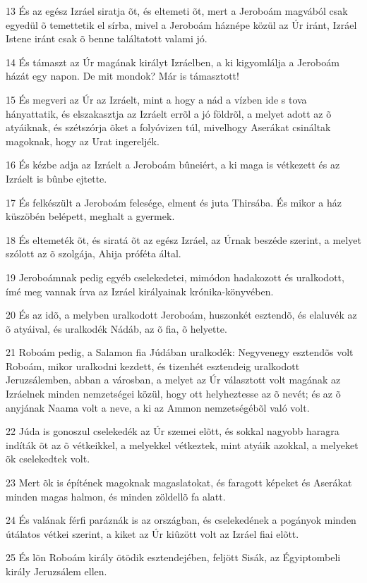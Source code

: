 \par 13 És az egész Izráel siratja õt, és eltemeti õt, mert a Jeroboám magvából csak egyedül õ temettetik el sírba, mivel a Jeroboám háznépe közül az Úr iránt, Izráel Istene iránt csak õ benne találtatott valami jó.
\par 14 És támaszt az Úr magának királyt Izráelben, a ki kigyomlálja a Jeroboám házát egy napon. De mit mondok? Már is támasztott!
\par 15 És megveri az Úr az Izráelt, mint a hogy a nád a vízben ide s tova hányattatik, és elszakasztja az Izráelt errõl a jó földrõl, a melyet adott az õ atyáiknak, és szétszórja õket a folyóvizen túl, mivelhogy Aserákat csináltak magoknak, hogy az Urat ingereljék.
\par 16 És kézbe adja az Izráelt a Jeroboám bûneiért, a ki maga is vétkezett és az Izráelt is bûnbe ejtette.
\par 17 És felkészült a Jeroboám felesége, elment és juta Thirsába. És mikor a ház küszöbén belépett, meghalt a gyermek.
\par 18 És eltemeték õt, és siratá õt az egész Izráel, az Úrnak beszéde szerint, a melyet szólott az õ szolgája, Ahija próféta által.
\par 19 Jeroboámnak pedig egyéb cselekedetei, mimódon hadakozott és uralkodott, ímé meg vannak írva az Izráel királyainak krónika-könyvében.
\par 20 És az idõ, a melyben uralkodott Jeroboám, huszonkét esztendõ, és elaluvék az õ atyáival, és uralkodék Nádáb, az õ fia, õ helyette.
\par 21 Roboám pedig, a Salamon fia Júdában uralkodék: Negyvenegy esztendõs volt Roboám, mikor uralkodni kezdett, és tizenhét esztendeig uralkodott Jeruzsálemben, abban a városban, a melyet az Úr választott volt magának az Izráelnek minden nemzetségei közül, hogy ott helyheztesse az õ nevét; és az õ anyjának Naama volt a neve, a ki az  Ammon nemzetségébõl való volt.
\par 22 Júda is gonoszul cselekedék az Úr szemei elõtt, és sokkal nagyobb haragra indíták õt az õ vétkeikkel, a melyekkel vétkeztek, mint atyáik azokkal, a melyeket õk cselekedtek volt.
\par 23 Mert õk is építének magoknak magaslatokat, és faragott képeket és Aserákat minden magas halmon, és minden zöldellõ fa alatt.
\par 24 És valának férfi paráznák is az országban, és cselekedének a pogányok minden útálatos vétkei  szerint, a kiket az Úr kiûzött volt az Izráel fiai elõtt.
\par 25 És lõn Roboám király ötödik esztendejében, feljött Sisák, az Égyiptombeli király Jeruzsálem ellen.
